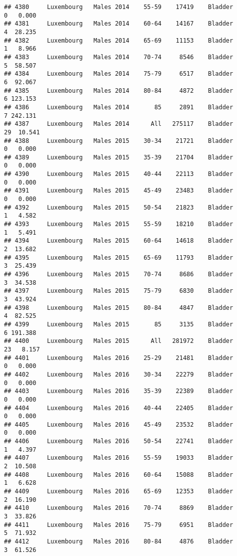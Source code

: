 \documentclass[
]{article}
\begin{document}
\begin{verbatim}
## 4380     Luxembourg   Males 2014    55-59    17419    Bladder      0   0.000
## 4381     Luxembourg   Males 2014    60-64    14167    Bladder      4  28.235
## 4382     Luxembourg   Males 2014    65-69    11153    Bladder      1   8.966
## 4383     Luxembourg   Males 2014    70-74     8546    Bladder      5  58.507
## 4384     Luxembourg   Males 2014    75-79     6517    Bladder      6  92.067
## 4385     Luxembourg   Males 2014    80-84     4872    Bladder      6 123.153
## 4386     Luxembourg   Males 2014       85     2891    Bladder      7 242.131
## 4387     Luxembourg   Males 2014      All   275117    Bladder     29  10.541
## 4388     Luxembourg   Males 2015    30-34    21721    Bladder      0   0.000
## 4389     Luxembourg   Males 2015    35-39    21704    Bladder      0   0.000
## 4390     Luxembourg   Males 2015    40-44    22113    Bladder      0   0.000
## 4391     Luxembourg   Males 2015    45-49    23483    Bladder      0   0.000
## 4392     Luxembourg   Males 2015    50-54    21823    Bladder      1   4.582
## 4393     Luxembourg   Males 2015    55-59    18210    Bladder      1   5.491
## 4394     Luxembourg   Males 2015    60-64    14618    Bladder      2  13.682
## 4395     Luxembourg   Males 2015    65-69    11793    Bladder      3  25.439
## 4396     Luxembourg   Males 2015    70-74     8686    Bladder      3  34.538
## 4397     Luxembourg   Males 2015    75-79     6830    Bladder      3  43.924
## 4398     Luxembourg   Males 2015    80-84     4847    Bladder      4  82.525
## 4399     Luxembourg   Males 2015       85     3135    Bladder      6 191.388
## 4400     Luxembourg   Males 2015      All   281972    Bladder     23   8.157
## 4401     Luxembourg   Males 2016    25-29    21481    Bladder      0   0.000
## 4402     Luxembourg   Males 2016    30-34    22279    Bladder      0   0.000
## 4403     Luxembourg   Males 2016    35-39    22389    Bladder      0   0.000
## 4404     Luxembourg   Males 2016    40-44    22405    Bladder      0   0.000
## 4405     Luxembourg   Males 2016    45-49    23532    Bladder      0   0.000
## 4406     Luxembourg   Males 2016    50-54    22741    Bladder      1   4.397
## 4407     Luxembourg   Males 2016    55-59    19033    Bladder      2  10.508
## 4408     Luxembourg   Males 2016    60-64    15088    Bladder      1   6.628
## 4409     Luxembourg   Males 2016    65-69    12353    Bladder      2  16.190
## 4410     Luxembourg   Males 2016    70-74     8869    Bladder      3  33.826
## 4411     Luxembourg   Males 2016    75-79     6951    Bladder      5  71.932
## 4412     Luxembourg   Males 2016    80-84     4876    Bladder      3  61.526

\end{verbatim}
\end{document}

